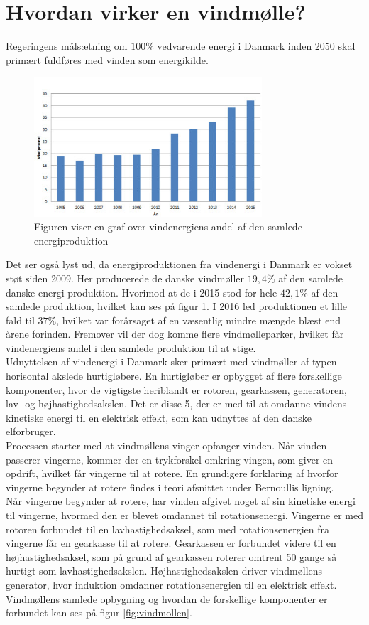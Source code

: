 \section{Hvordan virker en vindmølle?}
Regeringens målsætning om $100 \%$ vedvarende energi i Danmark inden 2050 skal primært fuldføres med vinden som energikilde. 

\begin{figure}
\includegraphics[width=8.5cm]{Billeder/vindgraf}
\caption{Figuren viser en graf over vindenergiens andel af den samlede energiproduktion \citep{2}}
\label{fig:vindgraf}
\end{figure}

Det ser også lyst ud, da energiproduktionen fra vindenergi i Danmark er vokset støt siden 2009. Her producerede de danske vindmøller $19,4 \%$ af den samlede danske energi produktion. Hvorimod at de i 2015 stod for hele $42,1 \%$ af den samlede produktion, hvilket kan ses på figur \ref{fig:vindgraf}. I 2016 led produktionen et lille fald til $37 \%$, hvilket var forårsaget af en væsentlig mindre mængde blæst end årene forinden. Fremover vil der dog komme flere vindmølleparker, hvilket får vindenergiens andel i den samlede produktion til at stige. \\
Udnyttelsen af vindenergi i Danmark sker primært med vindmøller af typen horisontal akslede hurtigløbere.
En hurtigløber er opbygget af flere forskellige komponenter, hvor de vigtigste heriblandt er rotoren, gearkassen, generatoren, lav- og højhastighedsakslen. Det er disse 5, der er med til at omdanne vindens kinetiske energi til en elektrisk effekt, som kan udnyttes af den danske elforbruger. \\
Processen starter med at vindmøllens vinger opfanger vinden. Når vinden passerer vingerne, kommer der en trykforskel omkring vingen, som giver en opdrift, hvilket får vingerne til at rotere. En grundigere forklaring af hvorfor vingerne begynder at rotere findes i teori afsnittet under Bernoullis ligning. \\
Når vingerne begynder at rotere, har vinden afgivet noget af sin kinetiske energi til vingerne, hvormed den er blevet omdannet til rotationsenergi. Vingerne er med rotoren forbundet til en lavhastighedsaksel, som med rotationsenergien fra vingerne får en gearkasse til at rotere. Gearkassen er forbundet videre til en højhastighedsaksel, som på grund af gearkassen roterer omtrent 50 gange så hurtigt som lavhastighedsakslen. Højhastighedsakslen driver vindmøllens generator, hvor induktion omdanner rotationsenergien til en elektrisk effekt. Vindmøllens samlede opbygning og hvordan de forskellige komponenter er forbundet kan ses på figur \ref{fig:vindmollen}.

